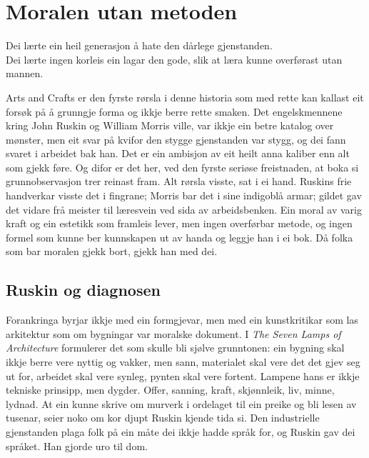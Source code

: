 \chapter{Moralen utan metoden}

\begin{motto}
Dei lærte ein heil generasjon å hate den dårlege gjenstanden.\\ Dei lærte ingen korleis ein lagar den gode, slik at læra kunne overførast utan mannen.
\end{motto}

Arts and Crafts er den fyrste rørsla i denne historia som med rette kan kallast eit forsøk på å grunngje forma og ikkje berre rette smaken. Det engelskmennene kring John Ruskin og William Morris ville, var ikkje ein betre katalog over mønster, men eit svar på kvifor den stygge gjenstanden var stygg, og dei fann svaret i arbeidet bak han. Det er ein ambisjon av eit heilt anna kaliber enn alt som gjekk føre. Og difor er det her, ved den fyrste seriøse freistnaden, at boka si grunnobservasjon trer reinast fram. Alt rørsla visste, sat i ei hand. Ruskins frie handverkar visste det i fingrane; Morris bar det i sine indigoblå armar; gildet gav det vidare frå meister til læresvein ved sida av arbeidsbenken. Ein moral av varig kraft og ein estetikk som framleis lever, men ingen overførbar metode, og ingen formel som kunne ber kunnskapen ut av handa og leggje han i ei bok. Då folka som bar moralen gjekk bort, gjekk han med dei.


\section{Ruskin og diagnosen}

Forankringa byrjar ikkje med ein formgjevar, men med ein kunstkritikar som las arkitektur som om bygningar var moralske dokument. I \textit{The Seven Lamps of Architecture} formulerer \textcite{ruskin1849seven} det som skulle bli sjølve grunntonen: ein bygning skal ikkje berre vere nyttig og vakker, men sann, materialet skal vere det det gjev seg ut for, arbeidet skal vere synleg, pynten skal vere fortent. Lampene hans er ikkje tekniske prinsipp, men dygder. Offer, sanning, kraft, skjønnleik, liv, minne, lydnad. At ein kunne skrive om murverk i ordelaget til ein preike og bli lesen av tusenar, seier noko om kor djupt Ruskin kjende tida si. Den industrielle gjenstanden plaga folk på ein måte dei ikkje hadde språk for, og Ruskin gav dei språket. Han gjorde uro til dom.

